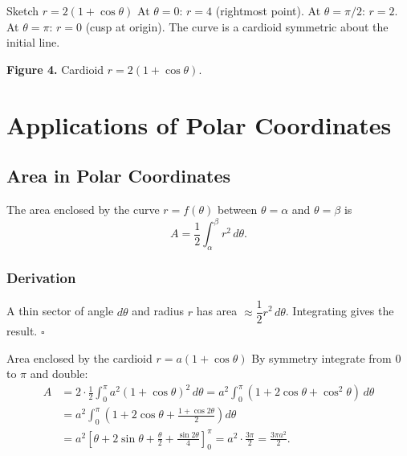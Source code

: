 \documentclass[12pt,a4paper]{article}
\theoremstyle{defstyle}
\begin{document}
\begin{example}{Sketch $r=2(1+\cos\theta)$}{}
At \(\theta=0\): \(r=4\) (rightmost point). At \(\theta=\pi/2\): \(r=2\). At \(\theta=\pi\): \(r=0\) (cusp at origin). The curve is a cardioid symmetric about the initial line.
\end{example}

\vspace{6pt}
\begin{center}
\end{center}
\noindent\textbf{Figure 4.} Cardioid \(r=2(1+\cos\theta)\).

\section{Applications of Polar Coordinates}

\subsection{Area in Polar Coordinates}

\begin{result}{}{}
The area enclosed by the curve \(r=f(\theta)\) between \(\theta=\alpha\) and \(\theta=\beta\) is
\[
  A = \frac{1}{2}\int_\alpha^\beta r^2\,d\theta.
\]
\end{result}

\subsubsection*{Derivation}
A thin sector of angle \(d\theta\) and radius \(r\) has area \(\approx\dfrac{1}{2}r^2\,d\theta\). Integrating gives the result. \(\square\)

\begin{example}{Area enclosed by the cardioid $r=a(1+\cos\theta)$}{}
By symmetry integrate from \(0\) to \(\pi\) and double:
\[
\begin{aligned}
  A &= 2\cdot\frac{1}{2}\int_0^\pi a^2(1+\cos\theta)^2\,d\theta
     = a^2\int_0^\pi(1+2\cos\theta+\cos^2\theta)\,d\theta \\[4pt]
    &= a^2\int_0^\pi\!\left(1+2\cos\theta+\frac{1+\cos2\theta}{2}\right)d\theta \\[4pt]
    &= a^2\left[\theta+2\sin\theta+\frac{\theta}{2}+\frac{\sin2\theta}{4}\right]_0^\pi
     = a^2\cdot\frac{3\pi}{2} = \frac{3\pi a^2}{2}.
\end{aligned}
\]
\end{example}
\end{document}

